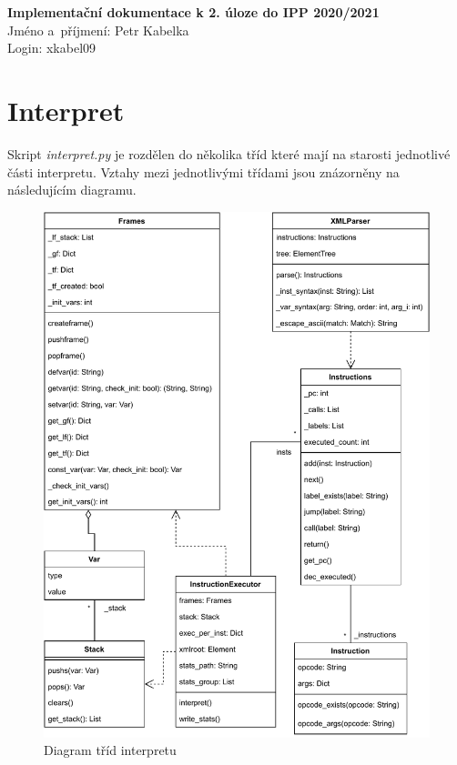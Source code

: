 \documentclass[10pt,a4paper]{article}
\begin{document}
    {\noindent\sffamily\large
        \textbf{Implementační dokumentace k 2. úloze do IPP 2020/2021} \\
        Jméno a~příjmení: Petr Kabelka \\
        Login: xkabel09
    }

    \section{Interpret}

    Skript \emph{interpret.py} je rozdělen do několika tříd které mají na starosti
    jednotlivé části interpretu. Vztahy mezi jednotlivými třídami jsou znázorněny na následujícím diagramu.

    \begin{figure}[ht]
        \centering
        \includegraphics[width=13cm]{interpret-class-diagram.pdf}
        \caption{Diagram tříd interpretu}
    \end{figure}
\end{document}

